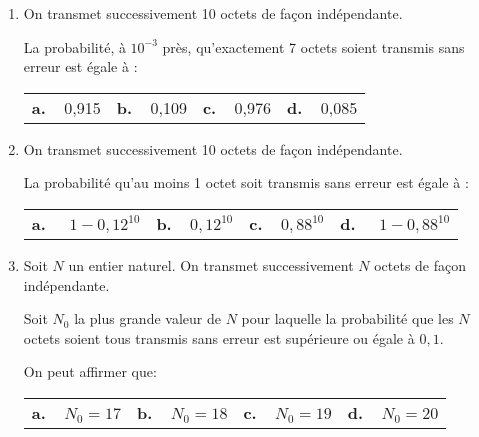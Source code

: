 \documentclass[11pt]{article}
\begin{document}
\begin{enumerate}[resume]
\item On transmet successivement 10 octets de façon indépendante.

La probabilité, à $10^{-3}$ près, qu'exactement 7 octets soient transmis sans erreur est égale à :

\begin{center}
\begin{tabularx}{\linewidth}{*{4}{X}}
\textbf{a.~~}0,915 &\textbf{b.~~}0,109 &\textbf{c.~~}0,976 &\textbf{d.~~}0,085
\end{tabularx}
\end{center}
\item On transmet successivement 10 octets de façon indépendante.

La probabilité qu'au moins 1 octet soit transmis sans erreur est égale à :

\begin{center}
\begin{tabularx}{\linewidth}{*{4}{X}}
\textbf{a.~~} $1 - 0,12^{10}$ &\textbf{b.~~}$0,12^{10}$ &\textbf{c.~~}$0,88^{10}$ &\textbf{d.~~} $1- 0,88^{10}$
\end{tabularx}
\end{center}
\item Soit $N$ un entier naturel. On transmet successivement $N$ octets de façon indépendante. 

Soit $N_0$ la plus grande valeur de $N$ pour laquelle la probabilité que les $N$ octets soient tous transmis sans erreur est supérieure ou égale à $0,1$.

On peut affirmer que:

\begin{center}
\begin{tabularx}{\linewidth}{*{4}{X}}
\textbf{a.~~}$N_0 = 17$ &\textbf{b.~~}$N_0 = 18$ &\textbf{c.~~}$N_0 = 19$ &\textbf{d.~~}$N_0 = 20$
\end{tabularx}
\end{center}
\end{enumerate}
\end{document}
